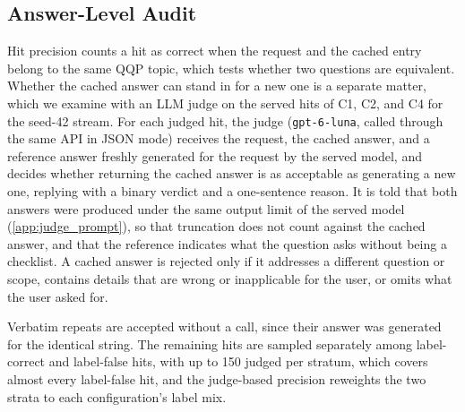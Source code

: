 \documentclass[authoryear,preprint,review,12pt]{elsarticle}
\begin{document}
\subsection{Answer-Level Audit}
\label{subsec:answer_audit}
Hit precision counts a hit as correct when the request and the cached entry belong to the same QQP topic, which tests whether two questions are equivalent. Whether the cached answer can stand in for a new one is a separate matter, which we examine with an LLM judge on the served hits of C1, C2, and C4 for the seed-42 stream. For each judged hit, the judge (\texttt{gpt-6-luna}, called through the same API in JSON mode) receives the request, the cached answer, and a reference answer freshly generated for the request by the served model, and decides whether returning the cached answer is as acceptable as generating a new one, replying with a binary verdict and a one-sentence reason. It is told that both answers were produced under the same output limit of the served model (\ref{app:judge_prompt}), so that truncation does not count against the cached answer, and that the reference indicates what the question asks without being a checklist. A cached answer is rejected only if it addresses a different question or scope, contains details that are wrong or inapplicable for the user, or omits what the user asked for.

Verbatim repeats are accepted without a call, since their answer was generated for the identical string. The remaining hits are sampled separately among label-correct and label-false hits, with up to 150 judged per stratum, which covers almost every label-false hit, and the judge-based precision reweights the two strata to each configuration's label mix.

\begin{table}[htbp]
\centering
\caption{Answer-level audit of the served hits on the seed-42 stream. Verbatim repeats are counted as acceptable; the other hits are judged within label strata (judged pairs in parentheses), and judge-based precision reweights the strata to each configuration's label mix, with its 95\% interval.}
\label{tab:answer_audit}
\end{table}
\end{document}
